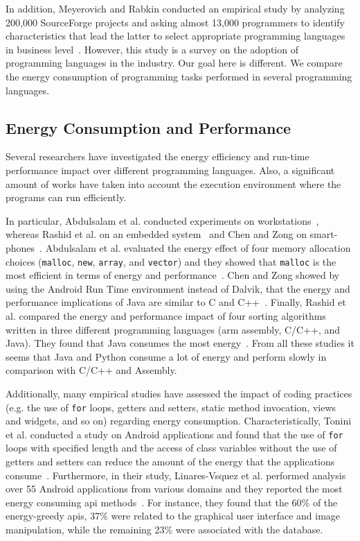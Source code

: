 In addition, Meyerovich and Rabkin conducted an empirical study 
by analyzing 200,000 SourceForge projects and asking almost 
13,000 programmers to identify characteristics that lead the 
latter to select appropriate programming languages in business 
level~\cite{MR13}.
However, this study is a survey on the adoption of programming 
languages in the industry.
Our goal here is different.
We compare the energy consumption of programming tasks
performed in several programming languages.


\subsection{Energy Consumption and Performance}
Several researchers have investigated the energy efficiency and 
run-time performance impact over different programming languages.
Also, a significant amount of works have taken into account the 
execution environment where the programs can run efficiently.

In particular, Abdulsalam et al. conducted experiments on 
workstations~\cite{ALG14}, whereas Rashid et al. on an embedded 
system~\cite{RAT15} and Chen and Zong on 
smart-phones~\cite{chen_android_2016}.
Abdulsalam et al. evaluated the energy effect of four memory
allocation choices ({\tt malloc}, {\tt new}, {\tt array}, and 
{\tt vector}) and they showed that {\tt malloc} is the most 
efficient in terms of energy and performance~\cite{ALG14}.
Chen and Zong showed by using the Android Run Time environment instead 
of Dalvik, that the energy and performance implications of Java
are similar to C and C++~\cite{chen_android_2016}.
Finally, Rashid et al. compared the energy and performance impact of four 
sorting algorithms written in three different programming 
languages ({\sc arm} assembly, C/C++, and Java). 
They found that Java consumes the most energy~\cite{RAT15}.
From all these studies it seems that Java and Python consume a 
lot of energy and perform slowly in comparison with C/C++ and 
Assembly.

Additionally, many empirical studies have assessed the impact
of coding practices
(e.g. the use of {\tt for} loops, getters and setters,
static method invocation, views and widgets, and so on)
regarding energy consumption.
Characteristically, Tonini et al. conducted a study on Android 
applications and found that the use of {\tt for} loops with 
specified length and the access of class variables without 
the use of getters and setters can reduce the amount of the 
energy that the applications consume~\cite{TFM13}.
Furthermore, in their study, Linares-Vsquez et al. performed 
analysis over 55 Android applications from various domains
and they reported the most energy consuming {\sc api} 
methods~\cite{LBB14}.
For instance, they found that the 60\% of the energy-greedy 
{\sc api}s, 37\% were related to the graphical user interface and
image manipulation, while the remaining 23\% were associated 
with the database.

